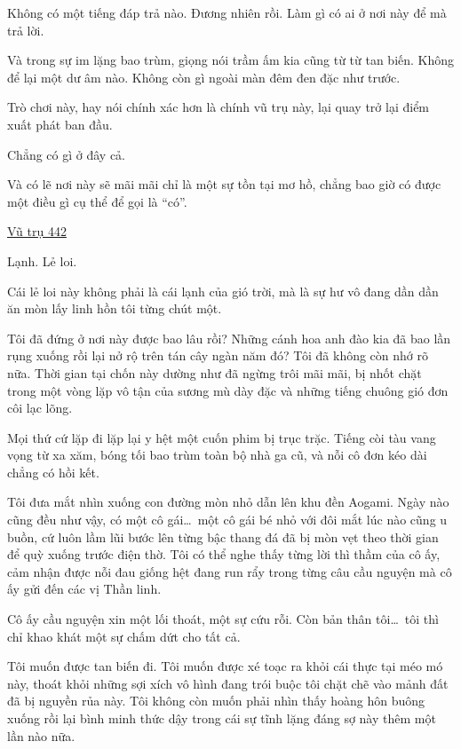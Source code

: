 \documentclass[../main.tex]{subfiles}
\begin{document}
Không có một tiếng đáp trả nào. Đương nhiên rồi. Làm gì có ai ở nơi này để mà trả lời.

Và trong sự im lặng bao trùm, giọng nói trầm ấm kia cũng từ từ tan biến. Không để lại một dư âm nào. Không còn gì ngoài màn đêm đen đặc như trước.

Trò chơi này, hay nói chính xác hơn là chính vũ trụ này, lại quay trở lại điểm xuất phát ban đầu.

Chẳng có gì ở đây cả.

Và có lẽ nơi này sẽ mãi mãi chỉ là một sự tồn tại mơ hồ, chẳng bao giờ có được một điều gì cụ thể để gọi là ``có''.

\begin{center}
  \uline{Vũ trụ 442}
\end{center}

Lạnh. Lẻ loi.

Cái lẻ loi này không phải là cái lạnh của gió trời, mà là sự hư vô đang dần dần ăn mòn lấy linh hồn tôi từng chút một.

Tôi đã đứng ở nơi này được bao lâu rồi? Những cánh hoa anh đào kia đã bao lần rụng xuống rồi lại nở rộ trên tán cây ngàn năm đó? Tôi đã không còn nhớ rõ nữa. Thời gian tại chốn này dường như đã ngừng trôi mãi mãi, bị nhốt chặt trong một vòng lặp vô tận của sương mù dày đặc và những tiếng chuông gió đơn côi lạc lõng.

Mọi thứ cứ lặp đi lặp lại y hệt một cuốn phim bị trục trặc. Tiếng còi tàu vang vọng từ xa xăm, bóng tối bao trùm toàn bộ nhà ga cũ, và nỗi cô đơn kéo dài chẳng có hồi kết.

Tôi đưa mắt nhìn xuống con đường mòn nhỏ dẫn lên khu đền Aogami. Ngày nào cũng đều như vậy, có một cô gái\dots\ một cô gái bé nhỏ với đôi mắt lúc nào cũng u buồn, cứ luôn lầm lũi bước lên từng bậc thang đá đã bị mòn vẹt theo thời gian để quỳ xuống trước điện thờ. Tôi có thể nghe thấy từng lời thì thầm của cô ấy, cảm nhận được nỗi đau giống hệt đang run rẩy trong từng câu cầu nguyện mà cô ấy gửi đến các vị Thần linh.

Cô ấy cầu nguyện xin một lối thoát, một sự cứu rỗi. Còn bản thân tôi\dots\ tôi thì chỉ khao khát một sự chấm dứt cho tất cả.

Tôi muốn được tan biến đi. Tôi muốn được xé toạc ra khỏi cái thực tại méo mó này, thoát khỏi những sợi xích vô hình đang trói buộc tôi chặt chẽ vào mảnh đất đã bị nguyền rủa này. Tôi không còn muốn phải nhìn thấy hoàng hôn buông xuống rồi lại bình minh thức dậy trong cái sự tĩnh lặng đáng sợ này thêm một lần nào nữa.
\end{document}
